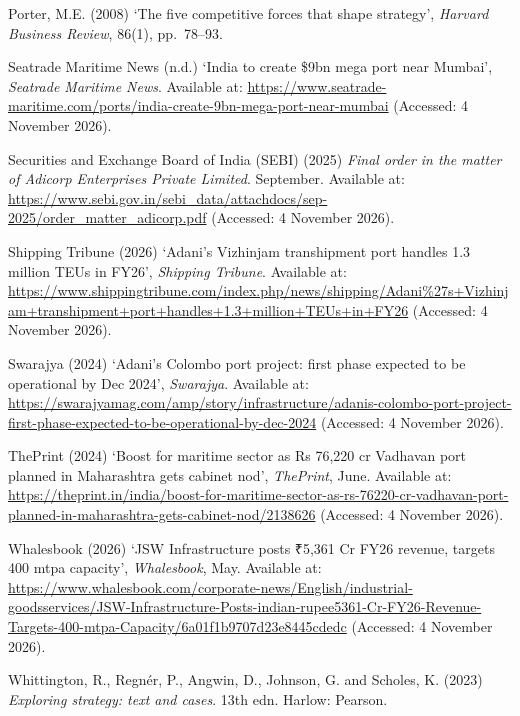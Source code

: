 \documentclass[12pt, a4paper]{article}
\begin{document}
\begin{list}{}{\setlength{\leftmargin}{8mm}\setlength{\itemindent}{-8mm}
               \setlength{\itemsep}{1.1ex}\setlength{\parsep}{0pt}
               \setlength{\topsep}{0pt}}
\item Porter, M.E. (2008) `The five competitive forces that shape strategy', \textit{Harvard Business Review}, 86(1), pp.~78--93.

\item Seatrade Maritime News (n.d.) `India to create \$9bn mega port near Mumbai', \textit{Seatrade Maritime News}. Available at: \url{https://www.seatrade-maritime.com/ports/india-create-9bn-mega-port-near-mumbai} (Accessed: 4 November 2026).

\item Securities and Exchange Board of India (SEBI) (2025) \textit{Final order in the matter of Adicorp Enterprises Private Limited}. September. Available at: \url{https://www.sebi.gov.in/sebi_data/attachdocs/sep-2025/order_matter_adicorp.pdf} (Accessed: 4 November 2026).

\item Shipping Tribune (2026) `Adani's Vizhinjam transhipment port handles 1.3 million TEUs in FY26', \textit{Shipping Tribune}. Available at: \url{https://www.shippingtribune.com/index.php/news/shipping/Adani%27s+Vizhinjam+transhipment+port+handles+1.3+million+TEUs+in+FY26} (Accessed: 4 November 2026).

\item Swarajya (2024) `Adani's Colombo port project: first phase expected to be operational by Dec 2024', \textit{Swarajya}. Available at: \url{https://swarajyamag.com/amp/story/infrastructure/adanis-colombo-port-project-first-phase-expected-to-be-operational-by-dec-2024} (Accessed: 4 November 2026).

\item ThePrint (2024) `Boost for maritime sector as Rs 76,220 cr Vadhavan port planned in Maharashtra gets cabinet nod', \textit{ThePrint}, June. Available at: \url{https://theprint.in/india/boost-for-maritime-sector-as-rs-76220-cr-vadhavan-port-planned-in-maharashtra-gets-cabinet-nod/2138626} (Accessed: 4 November 2026).

\item Whalesbook (2026) `JSW Infrastructure posts ₹5,361 Cr FY26 revenue, targets 400 mtpa capacity', \textit{Whalesbook}, May. Available at: \url{https://www.whalesbook.com/corporate-news/English/industrial-goodsservices/JSW-Infrastructure-Posts-indian-rupee5361-Cr-FY26-Revenue-Targets-400-mtpa-Capacity/6a01f1b9707d23e8445cdedc} (Accessed: 4 November 2026).

\item Whittington, R., Regn\'er, P., Angwin, D., Johnson, G. and Scholes, K. (2023) \textit{Exploring strategy: text and cases}. 13th edn. Harlow: Pearson.
\end{list}
\endgroup
\end{document}
